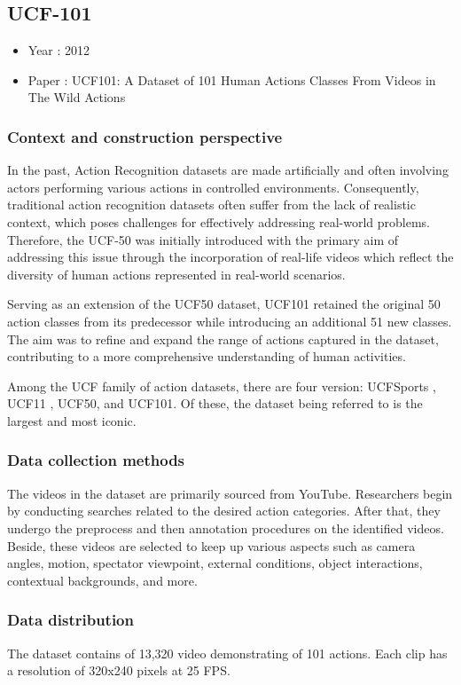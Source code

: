 \documentclass[10pt,onecolumn,letterpaper]{article}
\begin{document}
\subsection{UCF-101}

\begin{itemize}
	\item Year : 2012
	\item Paper : UCF101: A Dataset of 101 Human Actions Classes From Videos in The Wild
	Actions \cite{UCF101}
\end{itemize}

\subsubsection{\textbf{Context and construction perspective}}
In the past, Action Recognition datasets are made artificially and often involving actors performing various actions in controlled environments. Consequently, traditional action recognition datasets often suffer from the lack of realistic context, which poses challenges for effectively addressing real-world problems. Therefore, the UCF-50 was initially introduced with the primary aim of addressing this issue through the incorporation of real-life videos which reflect the diversity of human actions represented in real-world scenarios.

Serving as an extension of the UCF50 dataset, UCF101 retained the original 50 action classes from its predecessor while introducing an additional 51 new classes. The aim was to refine and expand the range of actions captured in the dataset, contributing to a more comprehensive understanding of human activities.

Among the UCF family of action datasets, there are four version: UCFSports \cite{UCFSports}, UCF11 \cite{UCFSports}, UCF50, and UCF101. Of these, the dataset being referred to is the largest and most iconic.
\subsubsection{Data collection methods}
The videos in the dataset are primarily sourced from YouTube. Researchers begin by conducting searches related to the desired action categories. After that, they undergo the preprocess and then annotation procedures on the identified videos. Beside, these videos are selected to keep up various aspects such as camera angles, motion, spectator viewpoint, external conditions, object interactions, contextual backgrounds, and more.
\subsubsection{Data distribution}
The dataset contains of 13,320 video demonstrating of 101 actions. Each clip has a resolution of 320x240 pixels at 25 FPS. 
\end{document}
